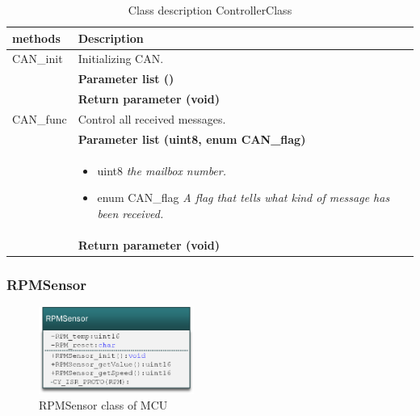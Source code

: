 \begin{table}[H]
	\centering
	\begin{tabular}{|p{5 cm}|p{10 cm}|}
		\hline
		\textbf{methods} & \textbf{Description} \\ \hline
		
		CAN\_init
		& Initializing CAN. 
		\\ & \textbf{Parameter list ()}
		\\ & \textbf{Return parameter (void)}
		\\ \hline
		
		CAN\_func
		& Control all received messages.
		\\ & \textbf{Parameter list (uint8, enum CAN\_flag)}
		\\ & \begin{itemize}
			\item {\large uint8}
			\subitem \textit{the mailbox number.}
			\item {\large enum CAN\_flag}
			\subitem \textit{A flag that tells what kind of message has been received.}
		\end{itemize}
		\\ & \textbf{Return parameter (void)}
		\\ \hline
		
		
	\end{tabular}
	\caption{Class description ControllerClass}
	\label{table:Class_description_CAN_MCU}
\end{table}

\subsubsection{RPMSensor}

\begin{figure}[H]
	\centering
	\includegraphics [width=2in]{Software/Pictures/class-diagram-RPMSensor.png}
	\caption{RPMSensor class of MCU}
	\label{fig:Class_diagram_MCU_RPMSensor}
\end{figure}

